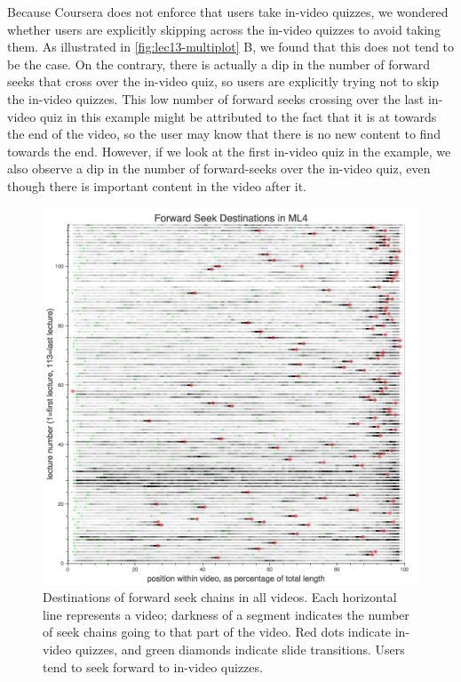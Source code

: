 \documentclass{sigchi}
\begin{document}
Because Coursera does not enforce that users take in-video quizzes, we wondered whether users are explicitly skipping across the in-video quizzes to avoid taking them. As illustrated in \autoref{fig:lec13-multiplot} B, we found that this does not tend to be the case. On the contrary, there is actually a dip in the number of forward seeks that cross over the in-video quiz, so users are explicitly trying not to skip the in-video quizzes. This low number of forward seeks crossing over the last in-video quiz in this example might be attributed to the fact that it is at towards the end of the video, so the user may know that there is no new content to find towards the end. However, if we look at the first in-video quiz in the example, we also observe a dip in the number of forward-seeks over the in-video quiz, even though there is important content in the video after it.


\begin{figure}
\includegraphics[width=1.0\columnwidth]{forward-seek-destinations-allvideos}
\caption{Destinations of forward seek chains in all videos. Each horizontal line represents a video; darkness of a segment indicates the number of seek chains going to that part of the video. Red dots indicate in-video quizzes, and green diamonds indicate slide transitions. Users tend to seek forward to in-video quizzes.}
\label{fig:forward-seek-destinations-allvideos}
\end{figure}
\end{document}
